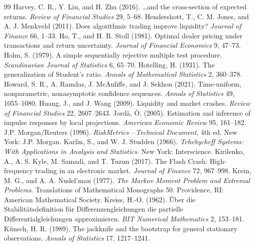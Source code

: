 \begin{thebibliography}{99}
 Harvey, C. R., Y. Liu, and H. Zhu (2016). \ldots and the cross-section of expected returns. \emph{Review of Financial Studies} 29, 5--68.
 Hendershott, T., C. M. Jones, and A. J. Menkveld (2011). Does algorithmic trading improve liquidity? \emph{Journal of Finance} 66, 1--33.
 Ho, T., and H. R. Stoll (1981). Optimal dealer pricing under transactions and return uncertainty. \emph{Journal of Financial Economics} 9, 47--73.
 Holm, S. (1979). A simple sequentially rejective multiple test procedure. \emph{Scandinavian Journal of Statistics} 6, 65--70.
 Hotelling, H. (1931). The generalization of Student's ratio. \emph{Annals of Mathematical Statistics} 2, 360--378.
 Howard, S. R., A. Ramdas, J. McAuliffe, and J. Sekhon (2021). Time-uniform, nonparametric, nonasymptotic confidence sequences. \emph{Annals of Statistics} 49, 1055--1080.
 Huang, J., and J. Wang (2009). Liquidity and market crashes. \emph{Review of Financial Studies} 22, 2607--2643.
 Jord\`a, \`O. (2005). Estimation and inference of impulse responses by local projections. \emph{American Economic Review} 95, 161--182.
 J.P. Morgan/Reuters (1996). \emph{RiskMetrics---Technical Document}, 4th ed. New York: J.P. Morgan.
 Karlin, S., and W. J. Studden (1966). \emph{Tchebycheff Systems: With Applications in Analysis and Statistics}. New York: Interscience.
 Kirilenko, A., A. S. Kyle, M. Samadi, and T. Tuzun (2017). The Flash Crash: High-frequency trading in an electronic market. \emph{Journal of Finance} 72, 967--998.
 Krein, M. G., and A. A. Nudel'man (1977). \emph{The Markov Moment Problem and Extremal Problems}. Translations of Mathematical Monographs 50. Providence, RI: American Mathematical Society.
 Kreiss, H.-O. (1962). \"Uber die Stabilit\"atsdefinition f\"ur Differenzengleichungen die partielle Differentialgleichungen approximieren. \emph{BIT Numerical Mathematics} 2, 153--181.
 K\"unsch, H. R. (1989). The jackknife and the bootstrap for general stationary observations. \emph{Annals of Statistics} 17, 1217--1241.

\end{thebibliography}
